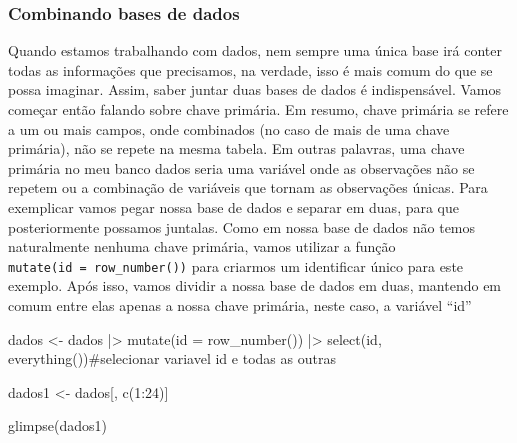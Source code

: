 \documentclass[
  letterpaper,
  DIV=11,
  numbers=noendperiod]{scrreprt}
\newenvironment{Shaded}{\begin{snugshade}}{\end{snugshade}}
\newcommand{\AttributeTok}[1]{\textcolor[rgb]{0.40,0.45,0.13}{#1}}
\newcommand{\CommentTok}[1]{\textcolor[rgb]{0.37,0.37,0.37}{#1}}
\newcommand{\DecValTok}[1]{\textcolor[rgb]{0.68,0.00,0.00}{#1}}
\newcommand{\FunctionTok}[1]{\textcolor[rgb]{0.28,0.35,0.67}{#1}}
\newcommand{\NormalTok}[1]{\textcolor[rgb]{0.00,0.23,0.31}{#1}}
\newcommand{\OtherTok}[1]{\textcolor[rgb]{0.00,0.23,0.31}{#1}}
\newcommand{\SpecialCharTok}[1]{\textcolor[rgb]{0.37,0.37,0.37}{#1}}
\begin{document}
\hypertarget{combinando-bases-de-dados}{%
\subsubsection{Combinando bases de
dados}\label{combinando-bases-de-dados}}

Quando estamos trabalhando com dados, nem sempre uma única base irá
conter todas as informações que precisamos, na verdade, isso é mais
comum do que se possa imaginar. Assim, saber juntar duas bases de dados
é indispensável. Vamos começar então falando sobre chave primária. Em
resumo, chave primária se refere a um ou mais campos, onde combinados
(no caso de mais de uma chave primária), não se repete na mesma tabela.
Em outras palavras, uma chave primária no meu banco dados seria uma
variável onde as observações não se repetem ou a combinação de variáveis
que tornam as observações únicas. Para exemplicar vamos pegar nossa base
de dados e separar em duas, para que posteriormente possamos juntalas.
Como em nossa base de dados não temos naturalmente nenhuma chave
primária, vamos utilizar a função \texttt{mutate(id\ =\ row\_number())}
para criarmos um identificar único para este exemplo. Após isso, vamos
dividir a nossa base de dados em duas, mantendo em comum entre elas
apenas a nossa chave primária, neste caso, a variável ``id''

\begin{Shaded}
\begin{Highlighting}[]
\NormalTok{dados }\OtherTok{\textless{}{-}}\NormalTok{ dados }\SpecialCharTok{|\textgreater{}} 
  \FunctionTok{mutate}\NormalTok{(}\AttributeTok{id =} \FunctionTok{row\_number}\NormalTok{()) }\SpecialCharTok{|\textgreater{}} 
  \FunctionTok{select}\NormalTok{(id, }\FunctionTok{everything}\NormalTok{())}\CommentTok{\#selecionar variavel id e todas as outras }

\NormalTok{dados1 }\OtherTok{\textless{}{-}}\NormalTok{ dados[, }\FunctionTok{c}\NormalTok{(}\DecValTok{1}\SpecialCharTok{:}\DecValTok{24}\NormalTok{)]}

\FunctionTok{glimpse}\NormalTok{(dados1)}
\end{Highlighting}
\end{Shaded}
\end{document}
